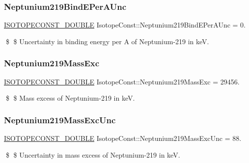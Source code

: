 \subsubsection{\texorpdfstring{Neptunium219\+Bind\+E\+Per\+A\+Unc}{Neptunium219BindEPerAUnc}}
{\footnotesize\ttfamily \mbox{\hyperlink{group___isotope_const-_macros_ga8f45a7272ce02c0b4c65c44636ed719a}{I\+S\+O\+T\+O\+P\+E\+C\+O\+N\+S\+T\+\_\+\+D\+O\+U\+B\+LE}} Isotope\+Const\+::\+Neptunium219\+Bind\+E\+Per\+A\+Unc = 0.}

\$ \$ Uncertainty in binding energy per A of Neptunium-\/219 in keV. \mbox{\label{group___isotope_const-_neptunium-_np219_ga5b69f70512c6e315f49cb27df37c83c9}} 
\subsubsection{\texorpdfstring{Neptunium219\+Mass\+Exc}{Neptunium219MassExc}}
{\footnotesize\ttfamily \mbox{\hyperlink{group___isotope_const-_macros_ga8f45a7272ce02c0b4c65c44636ed719a}{I\+S\+O\+T\+O\+P\+E\+C\+O\+N\+S\+T\+\_\+\+D\+O\+U\+B\+LE}} Isotope\+Const\+::\+Neptunium219\+Mass\+Exc = 29456.}

\$ \$ Mass excess of Neptunium-\/219 in keV. \mbox{\label{group___isotope_const-_neptunium-_np219_gacc551811c50e584e65dcef6a7cee3030}} 
\subsubsection{\texorpdfstring{Neptunium219\+Mass\+Exc\+Unc}{Neptunium219MassExcUnc}}
{\footnotesize\ttfamily \mbox{\hyperlink{group___isotope_const-_macros_ga8f45a7272ce02c0b4c65c44636ed719a}{I\+S\+O\+T\+O\+P\+E\+C\+O\+N\+S\+T\+\_\+\+D\+O\+U\+B\+LE}} Isotope\+Const\+::\+Neptunium219\+Mass\+Exc\+Unc = 88.}

\$ \$ Uncertainty in mass excess of Neptunium-\/219 in keV. \mbox{\label{group___isotope_const-_neptunium-_np219_ga5a8a2eff75f8453d424e949b83537f37}} 
